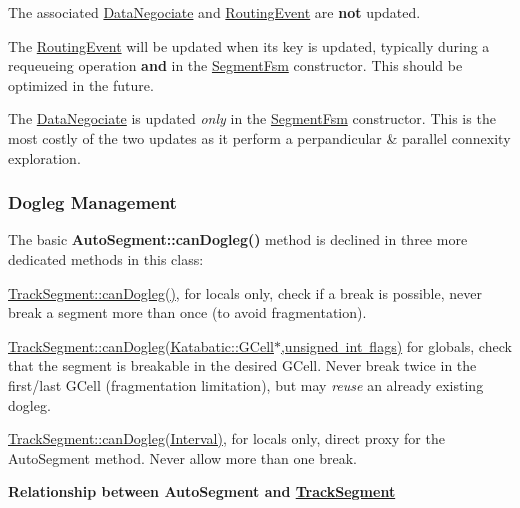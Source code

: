 The associated \mbox{\hyperlink{classKite_1_1DataNegociate}{Data\+Negociate}} and \mbox{\hyperlink{classKite_1_1RoutingEvent}{Routing\+Event}} are {\bfseries not} updated.
\begin{DoxyItemize}
\item The \mbox{\hyperlink{classKite_1_1RoutingEvent}{Routing\+Event}} will be updated when it\textquotesingle{}s key is updated, typically during a requeueing operation {\bfseries and} in the \mbox{\hyperlink{classKite_1_1SegmentFsm}{Segment\+Fsm}} constructor. This should be optimized in the future.
\item The \mbox{\hyperlink{classKite_1_1DataNegociate}{Data\+Negociate}} is updated {\itshape only} in the \mbox{\hyperlink{classKite_1_1SegmentFsm}{Segment\+Fsm}} constructor. This is the most costly of the two updates as it perform a perpandicular \& parallel connexity exploration.
\end{DoxyItemize}\hypertarget{classKite_1_1TrackSegment_secDogleg}{}\subsubsection{Dogleg Management}\label{classKite_1_1TrackSegment_secDogleg}
The basic \textbf{ Auto\+Segment\+::can\+Dogleg()} method is declined in three more dedicated methods in this class\+:
\begin{DoxyItemize}
\item \mbox{\hyperlink{classKite_1_1TrackSegment_aa0bb6f1592688e942ff67e0ac318a4fd}{Track\+Segment\+::can\+Dogleg()}}, for locals only, check if a break is possible, never break a segment more than once (to avoid fragmentation).
\item \mbox{\hyperlink{classKite_1_1TrackSegment_a4f040cf33009e4886d401115c3bea838}{Track\+Segment\+::can\+Dogleg(\+Katabatic\+::\+G\+Cell$\ast$,unsigned int flags)}} for globals, check that the segment is breakable in the desired G\+Cell. Never break twice in the first/last G\+Cell (fragmentation limitation), but may {\itshape reuse} an already existing dogleg.
\item \mbox{\hyperlink{classKite_1_1TrackSegment_accb4c6a7ee2678a0cff4dbc4a7860fe1}{Track\+Segment\+::can\+Dogleg(\+Interval)}}, for locals only, direct proxy for the Auto\+Segment method. Never allow more than one break.
\end{DoxyItemize}

{\bfseries Relationship between Auto\+Segment and \mbox{\hyperlink{classKite_1_1TrackSegment}{Track\+Segment}}}

